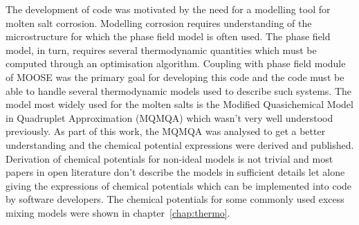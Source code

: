 	The development of code was motivated by the need for a modelling tool for molten salt corrosion. Modelling corrosion requires understanding of the microstructure for which the phase field model is often used. The phase field model, in turn, requires several thermodynamic quantities which must be computed through an optimisation algorithm. Coupling with phase field module of MOOSE was the primary goal for developing this code and the code must be able to handle several thermodynamic models used to describe such systems. The model most widely used for the molten salts is the Modified Quasichemical Model in Quadruplet Approximation (MQMQA) which wasn't very well understood previously. As part of this work, the MQMQA was analysed to get a better understanding and the chemical potential expressions were derived and published. Derivation of chemical potentials for non-ideal models is not trivial and most papers in open literature don't describe the models in sufficient details let alone giving the expressions of chemical potentials which can be implemented into code by software developers. The chemical potentials for some commonly used excess mixing models were shown in chapter~\ref{chap:thermo}.
	
